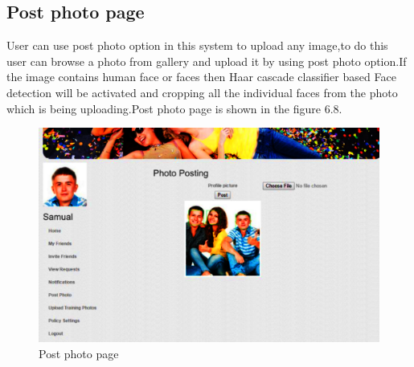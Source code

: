  \subsection[Post Photo Page]{Post photo page}
\noindent
User can use post photo option in this system to upload any image,to do this user can  browse a   photo from gallery and   upload it by using post photo option.If the image contains human face or faces then Haar cascade  classifier based Face detection  will be activated and cropping all the individual faces from the photo which is being uploading.Post photo page is shown in the figure 6.8. 
 \vspace{1cm} 
\vspace{1cm}
\vspace{1cm}
\begin{figure}[H]
\begin{minipage}[c]{1\linewidth}
\begin{center}
\includegraphics[width=\textwidth]{post.png}
            \caption[Post Photo Page]{Post photo page}
             \label{Face Detection}
\end{center}
 \end{minipage}           
\end{figure}
\clearpage

